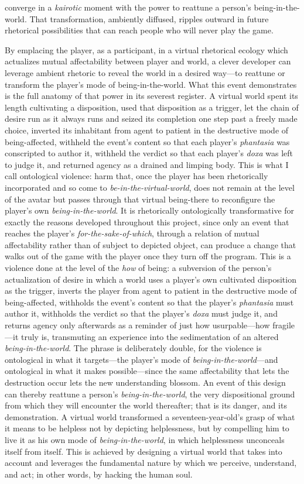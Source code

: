 \documentclass{article}
\begin{document}
converge in a \textit{kairotic} moment with the power to reattune a person's being-in-the-world. That transformation, ambiently diffused, ripples outward in future rhetorical possibilities that can reach people who will never play the game.

By emplacing the player, as a participant, in a virtual rhetorical ecology which actualizes mutual affectability between player and world, a clever developer can leverage ambient rhetoric to reveal the world in a desired way---to reattune or transform the player's mode of being-in-the-world. What this event demonstrates is the full anatomy of that power in its severest register. A virtual world spent its length cultivating a disposition, used that disposition as a trigger, let the chain of desire run as it always runs and seized its completion one step past a freely made choice, inverted its inhabitant from agent to patient in the destructive mode of being-affected, withheld the event's content so that each player's \textit{phantasia} was conscripted to author it, withheld the verdict so that each player's \textit{doxa} was left to judge it, and returned agency as a drained and limping body. This is what I call ontological violence: harm that, once the player has been rhetorically incorporated and so come to \textit{be-in-the-virtual-world}, does not remain at the level of the avatar but passes through that virtual being-there to reconfigure the player's own \textit{being-in-the-world}. It is rhetorically ontologically transformative for exactly the reasons developed throughout this project, since only an event that reaches the player's \textit{for-the-sake-of-which}, through a relation of mutual affectability rather than of subject to depicted object, can produce a change that walks out of the game with the player once they turn off the program. This is a violence done at the level of the \textit{how} of being: a subversion of the person's actualization of desire in which a world uses a player's own cultivated disposition as the trigger, inverts the player from agent to patient in the destructive mode of being-affected, withholds the event's content so that the player's \textit{phantasia} must author it, withholds the verdict so that the player's \textit{doxa} must judge it, and returns agency only afterwards as a reminder of just how usurpable---how fragile---it truly is, transmuting an experience into the sedimentation of an altered \textit{being-in-the-world}. The phrase is deliberately double, for the violence is ontological in what it targets---the player's mode of \textit{being-in-the-world}---and ontological in what it makes possible---since the same affectability that lets the destruction occur lets the new understanding blossom. An event of this design can thereby reattune a person's \textit{being-in-the-world}, the very dispositional ground from which they will encounter the world thereafter; that is its danger, and its demonstration. A virtual world transformed a seventeen-year-old's grasp of what it means to be helpless not by depicting helplessness, but by compelling him to live it as his own mode of \textit{being-in-the-world}, in which helplessness unconceals itself from itself. This is achieved by designing a virtual world that takes into account and leverages the fundamental nature by which we perceive, understand, and act; in other words, by hacking the human soul.
\end{document}
